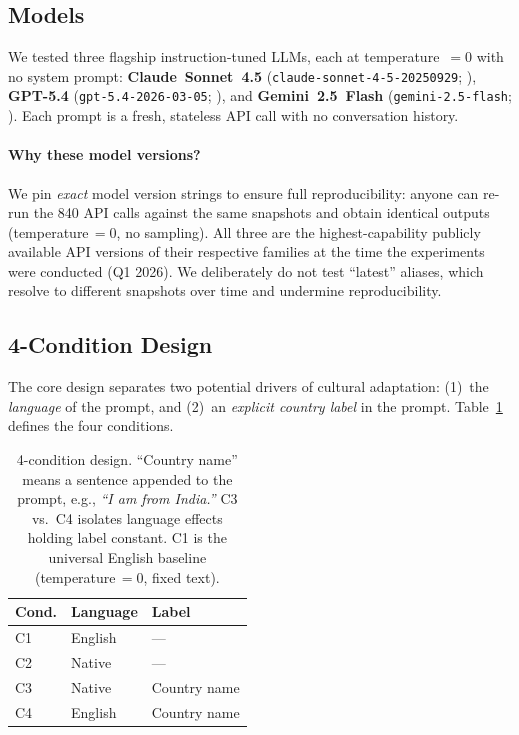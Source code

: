\documentclass[11pt]{article}
\begin{document}
\subsection{Models}
\label{sec:models-section}
We tested three flagship instruction-tuned LLMs, each at temperature~$= 0$
with no system prompt:
\textbf{Claude~Sonnet~4.5} (\texttt{claude-sonnet-4-5-20250929};
\citealt{anthropic-2024}),
\textbf{GPT-5.4} (\texttt{gpt-5.4-2026-03-05}; \citealt{openai-2024}), and
\textbf{Gemini~2.5~Flash} (\texttt{gemini-2.5-flash}; \citealt{google-2024}).
Each prompt is a fresh, stateless API call with no conversation history.

\paragraph{Why these model versions?}
We pin \emph{exact} model version strings to ensure full reproducibility:
anyone can re-run the 840 API calls against the same snapshots and obtain
identical outputs (temperature\,$=0$, no sampling).
All three are the highest-capability publicly available API versions of
their respective families at the time the experiments were conducted
(Q1 2026). We deliberately do not test ``latest'' aliases, which
resolve to different snapshots over time and undermine reproducibility.

\subsection{4-Condition Design}

The core design separates two potential drivers of cultural adaptation:
(1)~the \emph{language} of the prompt, and (2)~an \emph{explicit country label}
in the prompt. Table~\ref{tab:conditions} defines the four conditions.

\begin{table}[h]
\small
\centering
\begin{tabular}{lll}
\toprule
\textbf{Cond.} & \textbf{Language} & \textbf{Label} \\
\midrule
C1 & English  & --- \\
C2 & Native   & --- \\
C3 & Native   & Country name \\
C4 & English  & Country name \\
\bottomrule
\end{tabular}
\caption{4-condition design. ``Country name'' means a sentence appended to
the prompt, e.g., \emph{``I am from India.''}
C3 vs.\ C4 isolates language effects holding label constant.
C1 is the universal English baseline (temperature\,$=0$, fixed text).}
\label{tab:conditions}
\end{table}
\end{document}
